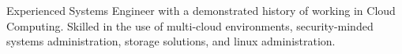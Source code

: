 
\begin{cvparagraph}

	{Experienced Systems Engineer with a demonstrated history of working in Cloud Computing. Skilled in the use of multi-cloud environments, security-minded systems administration, storage solutions, and linux administration.}
	
\end{cvparagraph}